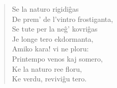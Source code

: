 \begin{verse}
                        Se la naturo rigidi\^gas\\
                        De prem' de l'vintro frostiganta,\\
                        Se tute per la ne\^g' kovri\^gas\\
                        Je longe tero ekdormanta,\\
                        Amiko kara! vi ne ploru:\\
                        Printempo venos kaj somero,\\
                        Ke la naturo ree floru,\\
                        Ke verdu, revivi\^gu tero.

\end{verse}

\smallrule{}